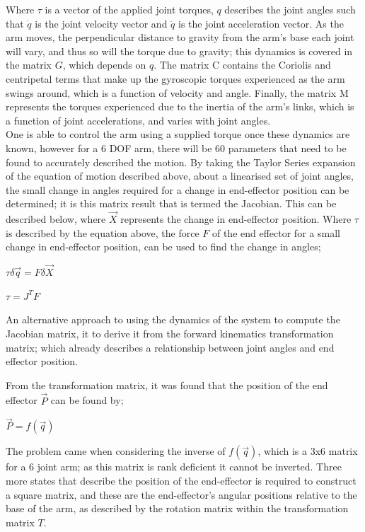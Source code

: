 \documentclass[12pt,openany,a4paper]{book}
\begin{document}
Where $\tau$ is a vector of the applied joint torques, $q$ describes the joint angles such that $\dot{q}$ is the joint velocity vector and $\ddot{q}$ is the joint acceleration vector. As the arm moves, the perpendicular distance to gravity from the arm's base each joint will vary, and thus so will the torque due to gravity; this dynamics is covered in the matrix $G$, which depends on $q$. The matrix C contains the Coriolis and centripetal terms that make up the gyroscopic torques experienced as the arm swings around, which is a function of velocity and angle. Finally, the matrix M represents the torques experienced due to the inertia of the arm's links, which is a function of joint accelerations, and varies with joint angles.\\
One is able to control the arm using a supplied torque once these dynamics are known, however for a 6 DOF arm, there will be 60 parameters that need to be found to accurately described the motion. By taking the Taylor Series expansion of the equation of motion described above, about a linearised set of joint angles, the small change in angles required for a change in end-effector position can be determined; it is this matrix result that is termed the Jacobian. This can be described below, where $\vec{X}$ represents the change in end-effector position. Where $\tau$ is described by the equation above, the force $F$ of the end effector for a small change in end-effector position, can be used to find the change in angles;

$\tau \delta \vec{q} = F \delta	\vec{X}$

$\tau = J^T F$

An alternative approach to using the dynamics of the system to compute the Jacobian matrix, it to derive it from the forward kinematics transformation matrix; which already describes a relationship between joint angles and end effector position. 

From the transformation matrix, it was found that the position of the end effector $\vec{P}$ can be found by;

$\vec{P} = f( \vec{q} )$

The problem came when considering the inverse of $f(\vec{q})$, which is a 3x6 matrix for a 6 joint arm; as this matrix is rank deficient it cannot be inverted. Three more states that describe the position of the end-effector is required to construct a square matrix, and these are the end-effector's angular positions relative to the base of the arm, as described by the rotation matrix within the transformation matrix $T$.
\end{document}
